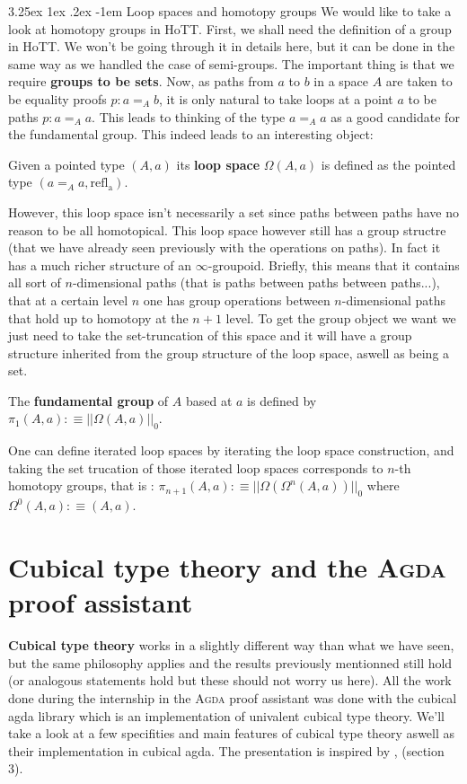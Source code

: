 \documentclass{report}
\makeatletter
\renewcommand\paragraph{\@startsection{paragraph}{5}{\z@}%
  {3.25ex \@plus1ex \@minus.2ex}%
  {-1em}%
  {\normalfont\normalsize\bfseries}}
\makeatother
\begin{document}
\paragraph{Loop spaces and homotopy groups} We would like to take a look at homotopy groups in HoTT. First, we shall need the definition of a group in HoTT. We won't be going through it in details here, but it can be done in the same way as we handled the case of semi-groups. The important thing is that we require \textbf{groups to be sets}. Now, as paths from $a$ to $b$ in a space $A$ are taken to be equality proofs $p :a=_A b$, it is only natural to take loops at a point $a$ to be paths $p : a=_A a$. This leads to thinking of the type $a=_A a$ as a good candidate for the fundamental group. This indeed leads to an interesting object:
\begin{mydef}
  Given a pointed type $(A,a)$ its \textbf{loop space} $\Omega(A,a)$ is defined as the pointed type $(a=_Aa,\mathrm{refl_a})$. 
\end{mydef}
However, this loop space isn't necessarily a set since paths between paths have no reason to be all homotopical. This loop space however still has a group structre (that we have already seen previously with the operations on paths). In fact it has a much richer structure of an $\infty$-groupoid. Briefly, this means that it contains all sort of $n$-dimensional paths (that is paths between paths between paths...), that at a certain level $n$ one has group operations between $n$-dimensional paths that hold up to homotopy at the $n+1$ level. To get the group object we want we just need to take the set-truncation of this space and it will have a group structure inherited from the group structure of the loop space, aswell as being a set.
\begin{mydef}
  The \textbf{fundamental group} of $A$ based at $a$ is defined by $\pi_1(A,a) :\equiv ||\Omega(A,a)||_0$.
\end{mydef}
One can define iterated loop spaces by iterating the loop space construction, and taking the set trucation of those iterated loop spaces corresponds to $n$-th homotopy groups, that is : $\pi_{n+1}(A,a) :\equiv ||\Omega(\Omega^n(A,a))||_0$ where $\Omega^0(A,a):\equiv (A,a)$.
\section{Cubical type theory and the \textsc{Agda} proof assistant}
\textbf{Cubical type theory} works in a slightly different way than what we have seen, but the same philosophy applies and the results previously mentionned still hold (or analogous statements hold but these should not worry us here). All the work done during the internship in the \textsc{Agda} proof assistant was done with the cubical agda library \cite{cubicalagda} which is an implementation of univalent cubical type theory. We'll take a look at a few specifities and main features of cubical type theory aswell as their implementation in cubical agda. The presentation is inspired by \cite{CubAgdaDoc} , \cite{CubTT} (section 3).
\end{document}
